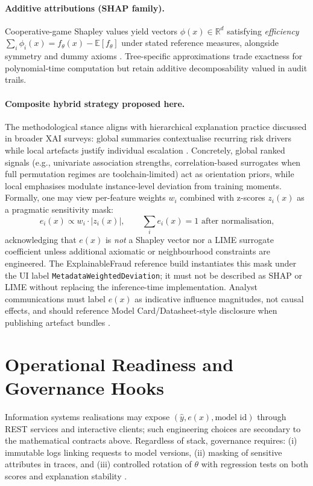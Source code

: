 \paragraph{Additive attributions (SHAP family).}
Cooperative-game Shapley values yield vectors $\phi(x)\in\mathbb{R}^d$ satisfying \emph{efficiency} $\sum_i \phi_i(x) = f_\theta(x) - \mathbb{E}[f_\theta]$ under stated reference measures, alongside symmetry and dummy axioms \cite{shap_original}. Tree-specific approximations trade exactness for polynomial-time computation but retain additive decomposability valued in audit trails.

\paragraph{Composite hybrid strategy proposed here.}
The methodological stance aligns with hierarchical explanation practice discussed in broader XAI surveys: global summaries contextualise recurring risk drivers while local artefacts justify individual escalation \cite{guidotti_blackbox_survey2018,xai_survey}. Concretely, global ranked signals (e.g., univariate association strengths, correlation-based surrogates when full permutation regimes are toolchain-limited) act as orientation priors, while local emphasises modulate instance-level deviation from training moments. Formally, one may view per-feature weights $w_i$ combined with z-scores $z_i(x)$ as a pragmatic sensitivity mask:
\begin{equation}
e_i(x) \propto w_i \cdot |z_i(x)|, \qquad \sum_i e_i(x) = 1 \text{ after normalisation,}
\end{equation}
acknowledging that $e(x)$ is \emph{not} a Shapley vector nor a LIME surrogate coefficient unless additional axiomatic or neighbourhood constraints are engineered. The ExplainableFraud reference build instantiates this mask under the UI label \texttt{MetadataWeightedDeviation}; it must not be described as SHAP or LIME without replacing the inference-time implementation. Analyst communications must label $e(x)$ as indicative influence magnitudes, not causal effects, and should reference Model Card/Datasheet-style disclosure when publishing artefact bundles \cite{mitchell2019model_cards,gebru2021datasheets}.

\section{Operational Readiness and Governance Hooks}
Information systems realisations may expose $(\hat{y}, e(x), \text{model id})$ through REST services and interactive clients; such engineering choices are secondary to the mathematical contracts above. Regardless of stack, governance requires: (i) immutable logs linking requests to model versions, (ii) masking of sensitive attributes in traces, and (iii) controlled rotation of $\theta$ with regression tests on both scores and explanation stability \cite{gdpr_text,xai_survey}.

